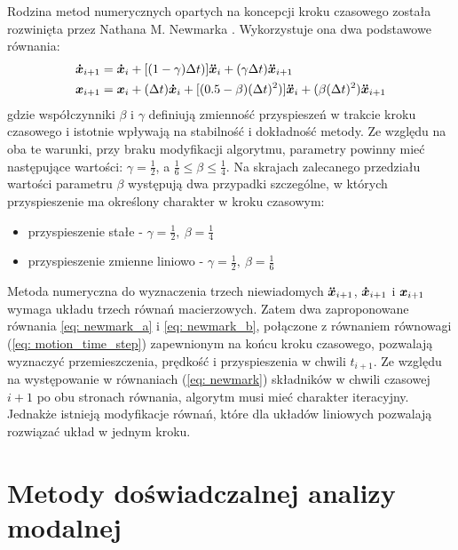 Rodzina metod numerycznych opartych na koncepcji kroku czasowego została rozwinięta przez Nathana M. Newmarka \parencite{Newmark1959}. Wykorzystuje ona dwa podstawowe równania:
\begin{subequations} \label{eq: newmark}
	\begin{align}
		\bm{\dot{x}}_{i+1} &= \bm{\dot{x}}_{i} + [(1-\gamma)\Delta t)]\bm{\ddot{x}}_{i} + (\gamma\Delta t)\bm{\ddot{x}}_{i+1} 
		\label{eq: newmark_a}\\
		\bm{x}_{i+1} &= \bm{x}_{i} + (\Delta t)\bm{\dot{x}}_{i} + [(0.5-\beta)(\Delta t)^2)]\bm{\ddot{x}}_{i}+ (\beta(\Delta t)^2)\bm{\ddot{x}}_{i+1} 
		\label{eq: newmark_b}
	\end{align}
\end{subequations}
gdzie współczynniki $\beta$ i $\gamma$ definiują zmienność przyspieszeń w trakcie kroku czasowego i istotnie wpływają na stabilność i dokładność metody. Ze względu na oba te warunki, przy braku modyfikacji algorytmu, parametry powinny mieć następujące wartości: $\gamma = \frac{1}{2}$, a $ \frac{1}{6}\leq \beta \leq \frac{1}{4}$. Na skrajach zalecanego przedziału wartości parametru $\beta$ występują dwa przypadki szczególne, w których przyspieszenie ma określony charakter w kroku czasowym:
\begin{itemize}
	\item przyspieszenie stałe - $\gamma = \frac{1}{2},\: \beta = \frac{1}{4}$
	\item przyspieszenie zmienne liniowo - $\gamma = \frac{1}{2},\: \beta = \frac{1}{6}$
\end{itemize}
Metoda numeryczna do wyznaczenia trzech niewiadomych $\bm{\ddot{x}}_{i+1}$, $\bm{\dot{x}}_{i+1}$ i $\bm{x}_{i+1}$ wymaga układu trzech równań macierzowych. Zatem dwa zaproponowane równania \ref{eq: newmark_a} i \ref{eq: newmark_b}, połączone z równaniem równowagi (\ref{eq: motion_time_step}) zapewnionym na końcu kroku czasowego, pozwalają wyznaczyć przemieszczenia, prędkość i przyspieszenia w chwili $t_{i+1}$. Ze względu na występowanie w równaniach (\ref{eq: newmark}) składników w chwili czasowej $i+1$ po obu stronach równania, algorytm musi mieć charakter iteracyjny. Jednakże istnieją modyfikacje równań, które dla układów liniowych pozwalają rozwiązać układ w jednym kroku.


\section{Metody doświadczalnej analizy modalnej}


